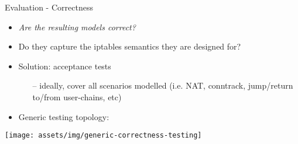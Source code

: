\documentclass{beamer}
\begin{document}
\begin{frame}{Evaluation - Correctness}
  \begin{itemize}
    \item \emph{Are the resulting models correct?}
    \item Do they capture the iptables semantics they are designed for?

    \vspace*{0.5cm}

    \item Solution: acceptance tests
      \begin{itemize}
        \item[--] ideally, cover all scenarios modelled (i.e. NAT, conntrack,
          jump/return to/from user-chains, etc)
      \end{itemize}
    \item Generic testing topology:
  \end{itemize}

  \vspace*{0.3cm}

  \centering
  \texttt{[image: assets/img/generic-correctness-testing]}
\end{frame}
\end{document}
